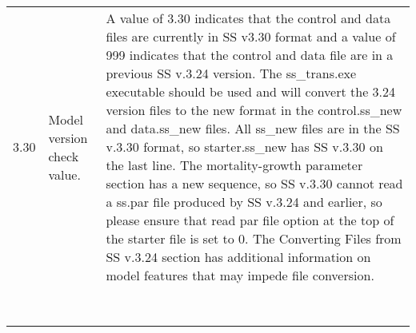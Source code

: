 {\begin{landscape}
\begin{longtable}{p{1.5cm} p{7.2cm} p{12.3cm}}
 \hline
 \hypertarget{Convert}{3.30} & Model version check value. & \multirow{1}{1cm}[-0.25cm]{\parbox{12.5cm}{ A value of 3.30 indicates that the control and data files are currently in SS v3.30 format and a value of 999 indicates that the control and data file are in a previous SS v.3.24 version. The ss\_trans.exe executable should be used and will convert the 3.24 version files to the new format in the control.ss\_new and data.ss\_new files.  All ss\_new files are in the SS v.3.30 format, so starter.ss\_new has SS v.3.30 on the last line.  The mortality-growth parameter section has a new sequence, so SS v.3.30 cannot read a ss.par file produced by SS v.3.24 and earlier, so please ensure that read par file option at the top of the starter file is set to 0. The \hypertarget{ConvIssues}  {Converting Files from SS v.3.24} section has additional information on model features that may impede file conversion.}}\Tstrut\\
     & & \\  
     & & \\  
	 & & \\
     & & \\
   	 & & \\
     & & \\  
     & & \\  
     & & \\       
\end{longtable}
\end{landscape}
}
\restoregeometry





\pagebreak
